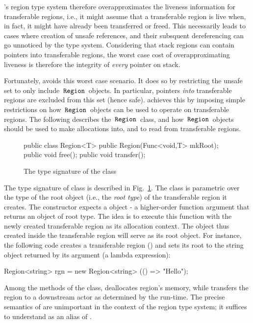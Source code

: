 \name's region type system therefore overapproximates the liveness
information for transferable regions, i.e., it might assume that a
transferable region is live when, in fact, it might have already been
transferred or freed. This necessarily leads to cases where creation of
unsafe references, and their subsquent dereferencing can go unnoticed
by the type system. Considering that stack regions can contain
pointers into transferable regions, the worst case cost of
overapproximating liveness is therefore the integrity of \emph{every}
pointer on stack.

Fortunately, \name avoids this worst case scenario. It does so by
restricting the unsafe set to only include $\,{\tt Region}\,$ objects. In
particular, pointers \emph{into} transferable regions are excluded
from this set (hence safe). \name achieves this by imposing simple
restrictions on how $\,{\tt Region}\,$ objects can be used to operate on
transferable regions. The following describes the $\,{\tt Region}\,$ class, and
how $\,{\tt Region}\,$ objects should be used to make allocations into, and to
read from transferable regions.

\begin{figure}
\begin{codejava}
  public class Region<T> {
    public Region(Func<void,T> mkRoot);
    public void free();
    public void transfer();
  }
\end{codejava}
\caption{The type signature of the  class}
\label{fig:region-class}
\end{figure}
The type signature of  class is described in
Fig.~\ref{fig:region-class}. The class is parametric over the type of
the root object (i.e., the \emph{root type}) of the transferable
region it creates. The  constructor expects a 
object - a higher-order function argument that returns an object of
root type.  The idea is to execute this function with the newly
created transferable region as its allocation context. The object thus
created inside the transferable region will serve as its root object.
For instance, the following code creates a transferable region
() and sets its root to the string object returned by its
 argument (a lambda expression):
\begin{codejava}
  Region<string> rgn = new Region<string>
                        (() => "Hello");
\end{codejava}
Among the methods of the  class,  deallocates
region's memory, while  transfers the region to a
downstream actor as determined by the run-time. The precise semantics
of  are unimportant in the context of the region type
system; it suffices to understand  as an alias of
.

